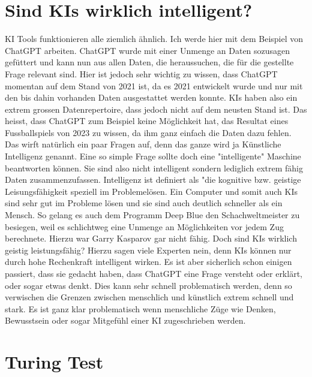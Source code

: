 \documentclass{report}
\begin{document}
\section{Sind KIs wirklich intelligent?}
KI Tools funktionieren alle ziemlich ähnlich. Ich werde hier mit dem Beispiel von ChatGPT arbeiten. ChatGPT wurde mit einer Unmenge an Daten sozusagen gefüttert und kann nun aus allen Daten, die heraussuchen, die für die gestellte Frage relevant sind.
Hier ist jedoch sehr wichtig zu wissen, dass ChatGPT momentan auf dem Stand von 2021 ist, da es 2021 entwickelt wurde und nur mit den bis dahin vorhanden Daten ausgestattet werden konnte. KIs haben also ein extrem grossen Datenrepertoire, dass jedoch nicht auf dem neusten Stand ist. Das heisst, dass ChatGPT zum Beispiel keine Möglichkeit hat, das Resultat eines Fussballspiels von 2023 zu wissen, da ihm ganz einfach die Daten dazu fehlen. Das wirft natürlich ein paar Fragen auf, denn das ganze wird ja Künstliche Intelligenz genannt. Eine so simple Frage sollte doch eine "intelligente" Maschine beantworten können. Sie sind also nicht intelligent sondern lediglich extrem fähig Daten zusammenzufassen. Intelligenz ist definiert als "die kognitive bzw. geistige Leisungsfähigkeit speziell im Problemelösen. Ein Computer und somit auch KIs sind sehr gut im Probleme lösen und sie sind auch deutlich schneller als ein Mensch. So gelang es auch dem Programm Deep Blue den Schachweltmeister zu besiegen, weil es schlichtweg eine Unmenge an Möglichkeiten vor jedem Zug berechnete. Hierzu war Garry Kasparov gar nicht fähig. Doch sind KIs wirklich geistig leistungsfähig? Hierzu sagen viele Experten nein, denn KIs können nur durch hohe Rechenkraft intelligent wirken. Es ist aber sicherlich schon einigen passiert, dass sie gedacht haben, dass ChatGPT eine Frage versteht oder erklärt, oder sogar etwas denkt. Dies kann sehr schnell problematisch werden, denn so verwischen die Grenzen zwischen menschlich und künstlich extrem schnell und stark. Es ist ganz klar problematisch wenn menschliche Züge wie Denken, Bewusstsein oder sogar Mitgefühl einer KI zugeschrieben werden. 

\section{Turing Test}
\end{document}
